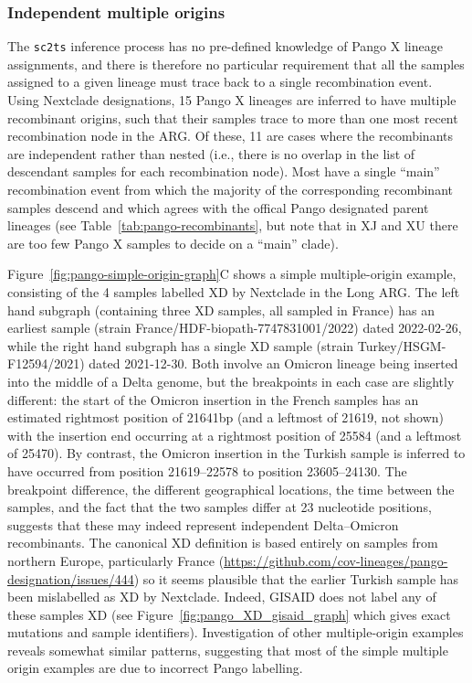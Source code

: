 \documentclass{article}
\begin{document}
\subsubsection{Independent multiple origins}
The \texttt{sc2ts} inference process has no pre-defined knowledge
of Pango X lineage assignments, and there is therefore no particular
requirement that all the samples assigned to a given lineage must trace back to
a single recombination event. Using Nextclade designations, 15 Pango X lineages are
inferred to have multiple
recombinant origins, such that their samples trace to more than one most recent
recombination node in the ARG. Of these, 11 are cases where the
recombinants are independent rather than nested (i.e., there is no overlap in the list
of descendant samples for each recombination node). Most have a single ``main''
recombination event from which the majority of the corresponding recombinant samples
descend and which agrees with the offical Pango designated parent lineages
(see Table~\ref{tab:pango-recombinants}, but note that
in XJ and XU there are too few Pango X samples to decide on a ``main'' clade).

Figure~\ref{fig:pango-simple-origin-graph}C shows a simple multiple-origin example, consisting of
the 4 samples labelled XD by Nextclade in the Long ARG. The left hand subgraph
(containing three XD samples, all sampled in France) has an earliest
sample (strain France/HDF-biopath-7747831001/2022) dated 2022-02-26, while the right hand
subgraph has a single XD sample (strain Turkey/HSGM-F12594/2021) dated 2021-12-30.
Both involve an Omicron lineage being inserted into the middle of a Delta genome, but
the breakpoints in each case are slightly different: the start of the Omicron insertion
in the French samples has an estimated rightmost position of 21641bp
(and a leftmost of 21619, not shown) with the insertion end occurring at a rightmost position of 25584
(and a leftmost of 25470). By contrast, the Omicron insertion in the Turkish sample
is inferred to have occurred from position 21619--22578 to position 23605--24130.
The breakpoint difference, the different geographical locations, the time between the
samples, and the fact that the two samples differ at 23 nucleotide positions,
suggests that these may indeed represent independent Delta--Omicron recombinants.
The canonical XD definition is based entirely on samples from northern Europe, particularly
France (\url{https://github.com/cov-lineages/pango-designation/issues/444}) so it seems
plausible that the earlier Turkish sample has been mislabelled as XD by Nextclade.
Indeed, GISAID does not label any of these samples XD (see
Figure~\ref{fig:pango_XD_gisaid_graph} which gives exact mutations and sample identifiers).
Investigation of other multiple-origin examples reveals somewhat similar patterns,
suggesting that most of the simple multiple origin examples are due to incorrect
Pango labelling.
\end{document}
